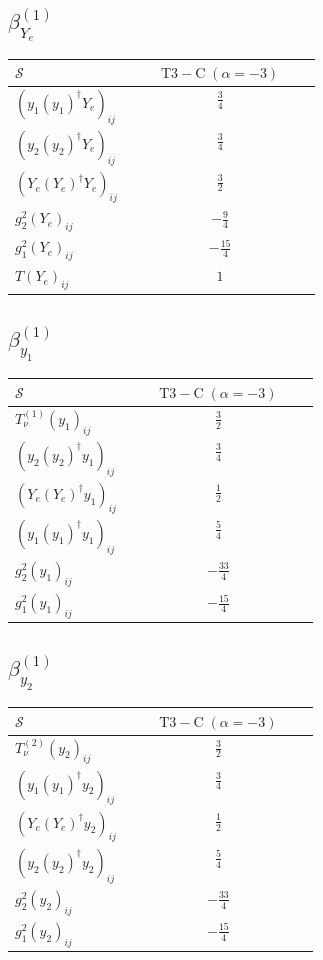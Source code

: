 \documentclass[9pt]{article}
\begin{document}
\subsection*{$ \beta_{Y_e}^{(1)} $}
\begin{longtable}{@{}p{0.38\linewidth}c@{}}
\toprule
$\mathcal{S}$ & $ \mathrm{T3-C}\;(\alpha=-3) $ \\
\midrule
$ (y_1 (y_1)^{\dagger} Y_e)_{ij} $ & $ \frac{3}{4} $ \\
$ (y_2 (y_2)^{\dagger} Y_e)_{ij} $ & $ \frac{3}{4} $ \\
$ (Y_e (Y_e)^{\dagger} Y_e)_{ij} $ & $ \frac{3}{2} $ \\
$ g_2^2 (Y_e)_{ij} $ & $ - \frac{9}{4} $ \\
$ g_1^2 (Y_e)_{ij} $ & $ - \frac{15}{4} $ \\
$ T (Y_e)_{ij} $ & $ 1 $ \\
\bottomrule
\end{longtable}
\subsection*{$ \beta_{y_1}^{(1)} $}
\begin{longtable}{@{}p{0.38\linewidth}c@{}}
\toprule
$\mathcal{S}$ & $ \mathrm{T3-C}\;(\alpha=-3) $ \\
\midrule
$ T_{\nu}^{(1)} (y_1)_{ij} $ & $ \frac{3}{2} $ \\
$ (y_2 (y_2)^{\dagger} y_1)_{ij} $ & $ \frac{3}{4} $ \\
$ (Y_e (Y_e)^{\dagger} y_1)_{ij} $ & $ \frac{1}{2} $ \\
$ (y_1 (y_1)^{\dagger} y_1)_{ij} $ & $ \frac{5}{4} $ \\
$ g_2^2 (y_1)_{ij} $ & $ - \frac{33}{4} $ \\
$ g_1^2 (y_1)_{ij} $ & $ - \frac{15}{4} $ \\
\bottomrule
\end{longtable}
\subsection*{$ \beta_{y_2}^{(1)} $}
\begin{longtable}{@{}p{0.38\linewidth}c@{}}
\toprule
$\mathcal{S}$ & $ \mathrm{T3-C}\;(\alpha=-3) $ \\
\midrule
$ T_{\nu}^{(2)} (y_2)_{ij} $ & $ \frac{3}{2} $ \\
$ (y_1 (y_1)^{\dagger} y_2)_{ij} $ & $ \frac{3}{4} $ \\
$ (Y_e (Y_e)^{\dagger} y_2)_{ij} $ & $ \frac{1}{2} $ \\
$ (y_2 (y_2)^{\dagger} y_2)_{ij} $ & $ \frac{5}{4} $ \\
$ g_2^2 (y_2)_{ij} $ & $ - \frac{33}{4} $ \\
$ g_1^2 (y_2)_{ij} $ & $ - \frac{15}{4} $ \\
\bottomrule
\end{longtable}
\end{document}
